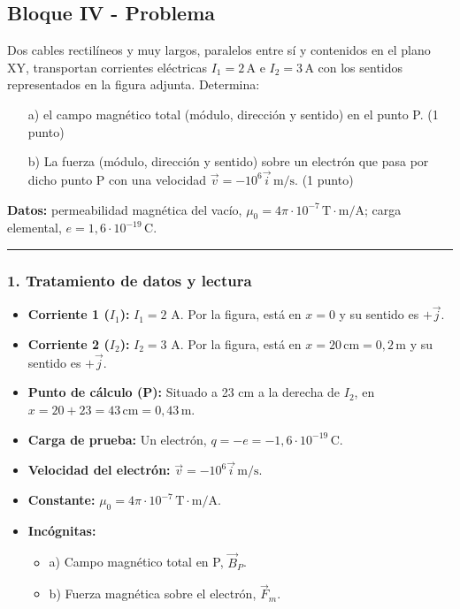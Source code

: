 \newpage
\subsection{Bloque IV - Problema}
\label{subsec:IV_B_2013_jun_ord}

\begin{cajaenunciado}
Dos cables rectilíneos y muy largos, paralelos entre sí y contenidos en el plano XY, transportan corrientes eléctricas $I_1 = 2\,\text{A}$ e $I_2 = 3\,\text{A}$ con los sentidos representados en la figura adjunta. Determina:
\begin{enumerate}
    \item[a)] el campo magnético total (módulo, dirección y sentido) en el punto P. (1 punto)
    \item[b)] La fuerza (módulo, dirección y sentido) sobre un electrón que pasa por dicho punto P con una velocidad $\vec{v}=-10^6 \vec{i} \, \text{m/s}$. (1 punto)
\end{enumerate}
\textbf{Datos:} permeabilidad magnética del vacío, $\mu_0=4\pi\cdot10^{-7}\,\text{T}\cdot\text{m/A}$; carga elemental, $e=1,6\cdot10^{-19}\,\text{C}$.
\end{cajaenunciado}
\hrule

\subsubsection*{1. Tratamiento de datos y lectura}
\begin{itemize}
    \item \textbf{Corriente 1 ($I_1$):} $I_1=2$ A. Por la figura, está en $x=0$ y su sentido es $+\vec{j}$.
    \item \textbf{Corriente 2 ($I_2$):} $I_2=3$ A. Por la figura, está en $x=20\,\text{cm}=0,2\,\text{m}$ y su sentido es $+\vec{j}$.
    \item \textbf{Punto de cálculo (P):} Situado a 23 cm a la derecha de $I_2$, en $x=20+23=43\,\text{cm}=0,43\,\text{m}$.
    \item \textbf{Carga de prueba:} Un electrón, $q=-e = -1,6\cdot10^{-19}\,\text{C}$.
    \item \textbf{Velocidad del electrón:} $\vec{v}=-10^6 \vec{i} \, \text{m/s}$.
    \item \textbf{Constante:} $\mu_0 = 4\pi\cdot10^{-7}\,\text{T}\cdot\text{m/A}$.
    \item \textbf{Incógnitas:}
    \begin{itemize}
        \item a) Campo magnético total en P, $\vec{B}_P$.
        \item b) Fuerza magnética sobre el electrón, $\vec{F}_m$.
    \end{itemize}
\end{itemize}

